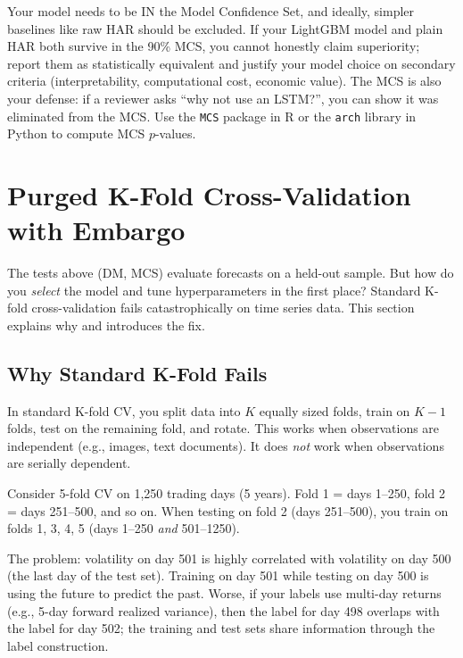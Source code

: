 \begin{projectconnection}
Your model needs to be IN the Model Confidence Set, and ideally, simpler baselines like raw HAR should be excluded.
If your LightGBM model and plain HAR both survive in the 90\% MCS, you cannot honestly claim superiority; report them as statistically equivalent and justify your model choice on secondary criteria (interpretability, computational cost, economic value).
The MCS is also your defense: if a reviewer asks ``why not use an LSTM?'', you can show it was eliminated from the MCS.
Use the \texttt{MCS} package in R or the \texttt{arch} library in Python to compute MCS $p$-values.
\end{projectconnection}


\section{Purged K-Fold Cross-Validation with Embargo}
\label{sec:eval-purgedcv}

The tests above (DM, MCS) evaluate forecasts on a held-out sample.
But how do you \emph{select} the model and tune hyperparameters in the first place?
Standard K-fold cross-validation fails catastrophically on time series data.
This section explains why and introduces the fix.

\subsection{Why Standard K-Fold Fails}

\begin{prereq}
In standard K-fold CV, you split data into $K$ equally sized folds, train on $K-1$ folds, test on the remaining fold, and rotate.
This works when observations are independent (e.g., images, text documents).
It does \emph{not} work when observations are serially dependent.
\end{prereq}

Consider 5-fold CV on 1,250 trading days (5 years).
Fold 1 = days 1--250, fold 2 = days 251--500, and so on.
When testing on fold 2 (days 251--500), you train on folds 1, 3, 4, 5 (days 1--250 \emph{and} 501--1250).

The problem: volatility on day 501 is highly correlated with volatility on day 500 (the last day of the test set).
Training on day 501 while testing on day 500 is using the future to predict the past.
Worse, if your labels use multi-day returns (e.g., 5-day forward realized variance), then the label for day 498 overlaps with the label for day 502; the training and test sets share information through the label construction.

